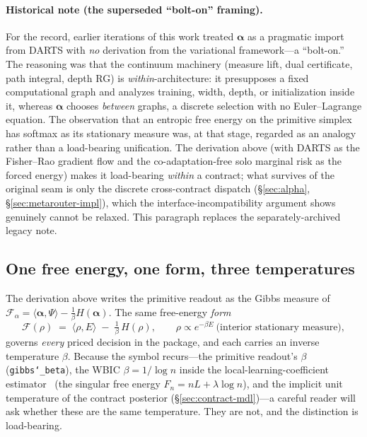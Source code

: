 \documentclass[11pt]{article}
\newcommand{\allowbreakhere}{\discretionary{}{}{}}
\newcommand{\code}[1]{\texttt{\def\_{\char`_\allowbreakhere}#1}}
\newcommand{\alphapar}{\bm{\alpha}}
\newcommand{\F}{\mathcal{F}}
\begin{document}
\paragraph{Historical note (the superseded ``bolt-on'' framing).} For the record, earlier iterations of
this work treated $\alphapar$ as a pragmatic import from DARTS with \emph{no} derivation from the
variational framework---a ``bolt-on.'' The reasoning was that the continuum machinery (measure lift, dual
certificate, path integral, depth RG) is \emph{within}-architecture: it presupposes a fixed computational
graph and analyzes training, width, depth, or initialization inside it, whereas $\alphapar$ chooses
\emph{between} graphs, a discrete selection with no Euler--Lagrange equation. The observation that an
entropic free energy on the primitive simplex has softmax as its stationary measure was, at that stage,
regarded as an analogy rather than a load-bearing unification. The derivation above (with DARTS as the
Fisher--Rao gradient flow and the co-adaptation-free solo marginal risk as the forced energy) makes it
load-bearing \emph{within} a contract; what survives of the original seam is only the discrete
cross-contract dispatch (\S\ref{sec:alpha}, \S\ref{sec:metarouter-impl}), which the interface-incompatibility
argument shows genuinely cannot be relaxed. This paragraph replaces the separately-archived legacy note.


\subsection{One free energy, one form, three temperatures}
\label{sec:thermo-potential}

The derivation above writes the primitive readout as the Gibbs measure of $\F_\alpha=\langle\alphapar,\Psi\rangle-\tfrac1\beta H(\alphapar)$. The same free-energy \emph{form}
\begin{equation}
\F(\rho)\;=\;\langle\rho,E\rangle\;-\;\tfrac{1}{\beta}\,H(\rho),
\qquad \rho\propto e^{-\beta E}\ \text{(interior stationary measure)},
\label{eq:one-form}
\end{equation}
governs \emph{every} priced decision in the package, and each carries an inverse temperature $\beta$. Because the symbol recurs---the primitive readout's $\beta$ (\code{gibbs\_beta}), the WBIC $\beta=1/\log n$ inside the local-learning-coefficient estimator~\cite{lau2023llc,watanabe2009slt} (the singular free energy $F_n=nL+\lambda\log n$), and the implicit unit temperature of the contract posterior (\S\ref{sec:contract-mdl})---a careful reader will ask whether these are the same temperature. They are not, and the distinction is load-bearing.
\end{document}
